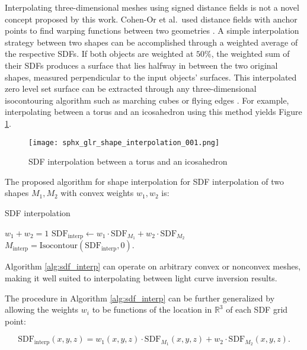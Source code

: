 Interpolating three-dimensional meshes using signed distance fields is not a novel concept proposed by this work. Cohen-Or et al.\ used distance fields with anchor points to find warping functions between two geometries \cite{cohen_or1998}. A simple interpolation strategy between two shapes can be accomplished through a weighted average of the respective SDFs. If both objects are weighted at $50\%$, the weighted sum of their SDFs produces a surface that lies halfway in between the two original shapes, measured perpendicular to the input objects' surfaces. This interpolated zero level set surface can be extracted through any three-dimensional isocontouring algorithm such as marching cubes \cite{lorensen1987} or flying edges \cite{schroeder2015}. For example, interpolating between a torus and an icosahedron using this method yields Figure \ref{fig:interpolating_torus_ico}. 

\begin{figure}[!htb]
  \centering
  \texttt{[image: sphx\_glr\_shape\_interpolation\_001.png]}
  \caption{SDF interpolation between a torus and an icosahedron}
  \label{fig:interpolating_torus_ico}
\end{figure}

The proposed algorithm for shape interpolation for SDF interpolation of two shapes $M_1, M_2$ with convex weights $w_1, w_2$ is:

\begin{algorithm}
  \caption{SDF interpolation}\label{alg:sdf_interp}
  \begin{algorithmic}
  \Require $w_1 + w_2 = 1$
  \State $\mathrm{SDF}_{\textrm{interp}} \gets w_1 \cdot \mathrm{SDF}_{M_1} + w_2 \cdot \mathrm{SDF}_{M_2}$
  \State $M_{\textrm{interp}} = \mathrm{Isocontour}(\mathrm{SDF}_{\textrm{interp}}, 0)$.
  \end{algorithmic}
\end{algorithm}

Algorithm \ref{alg:sdf_interp} can operate on arbitrary convex or nonconvex meshes, making it well suited to interpolating between light curve inversion results.

The procedure in Algorithm \ref{alg:sdf_interp} can be further generalized by allowing the weights $w_i$ to be functions of the location in $\mathbb{R}^3$ of each SDF grid point:

\begin{equation}
  \mathrm{SDF}_{\mathrm{interp}}(x, y, z) = w_1(x, y, z) \cdot \mathrm{SDF}_{M_1}(x, y, z) + w_2 \cdot \mathrm{SDF}_{M_2}(x, y, z).
\end{equation}

